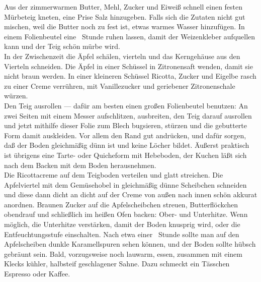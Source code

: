       \begin{zubereitung}
        Aus der zimmerwarmen Butter, Mehl, Zucker und Eiweiß schnell einen
	festen Mürbeteig kneten, eine Prise Salz hinzugeben. Falls sich die
	Zutaten nicht gut mischen, weil die Butter noch zu fest ist, etwas
	warmes Wasser hinzufügen. In einem Folienbeutel eine \breh{}~Stunde
	ruhen lassen, damit der Weizenkleber aufquellen kann und der Teig
	schön mürbe wird. \\
	In der Zwischenzeit die Äpfel schälen, vierteln und das Kerngehäuse
	aus den Vierteln schneiden. Die Äpfel in einer Schüssel in
	Zitronensaft wenden, damit sie nicht braun werden. In einer kleineren
	Schüssel Ricotta, Zucker und Eigelbe rasch zu einer Creme verrühren,
	mit Vanillezucker und geriebener Zitronenschale würzen. \\
	Den Teig ausrollen --- dafür am besten einen großen Folienbeutel
	benutzen: An zwei Seiten mit einem Messer aufschlitzen, ausbreiten, den
	Teig darauf ausrollen und jetzt mithilfe dieser Folie zum Blech
	bugsieren, stürzen und die gebutterte Form damit auskleiden. Vor allem
	den Rand gut andrücken, und dafür sorgen, daß der Boden gleichmäßig
	dünn ist und keine Löcher bildet. Äußerst praktisch ist übrigens eine
	Tarte- oder Quicheform mit Hebeboden, der Kuchen läßt sich nach dem
	Backen mit dem Boden herausnehmen. \\
	Die Ricottacreme auf dem Teigboden verteilen und glatt streichen. Die
	Apfelviertel mit dem Gemüsehobel in gleichmäßig dünne Scheibchen
	schneiden und diese dann dicht an dicht auf der Creme von außen nach
	innen schön akkurat anordnen. Braunen Zucker auf die Apfelscheibchen
	streuen, Butterflöckchen obendrauf und schließlich im heißen Ofen
	backen:  Ober- und Unterhitze. Wenn möglich, die
	Unterhitze verstärken, damit der Boden knusprig wird, oder die
	Entfeuchtungsstufe einschalten. Nach etwa einer \breh{}~Stunde sollte
	man auf den Apfelscheiben dunkle Karamellspuren sehen können, und der
	Boden sollte hübsch gebräunt sein. Bald, vorzugsweise noch lauwarm,
	essen, zusammen mit einem Klecks kühler, halbsteif geschlagener Sahne.
	Dazu schmeckt ein Tässchen Espresso oder Kaffee. \\
      \end{zubereitung}



